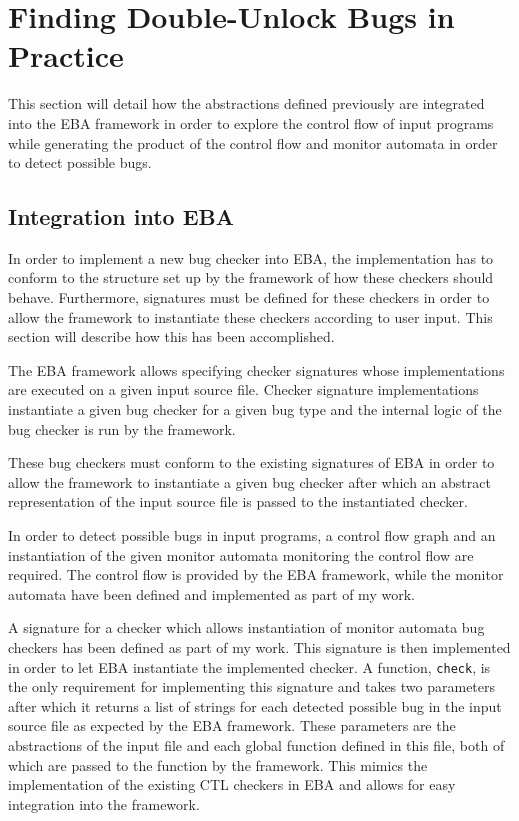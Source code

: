 \section{Finding Double-Unlock Bugs in Practice}
This section will detail how the abstractions defined previously are integrated into the EBA framework in order to explore the control flow of input programs while generating the product of the control flow and monitor automata in order to detect possible bugs. 

\subsection{Integration into EBA}
In order to implement a new bug checker into EBA, the implementation has to conform to the structure set up by the framework of how these checkers should behave. Furthermore, signatures must be defined for these checkers in order to allow the framework to instantiate these checkers according to user input. This section will describe how this has been accomplished.  

\newpar The EBA framework allows specifying checker signatures whose implementations are executed on a given input source file. Checker signature implementations instantiate a given bug checker for a given bug type and the internal logic of the bug checker is run by the framework. 

\newpar These bug checkers must conform to the existing signatures of EBA in order to allow the framework to instantiate a given bug checker after which an abstract representation of the input source file is passed to the instantiated checker. 

\newpar In order to detect possible bugs in input programs, a control flow graph and an instantiation of the given monitor automata monitoring the control flow are required. The control flow is provided by the EBA framework, while the monitor automata have been defined and implemented as part of my work. 

\newpar A signature for a checker which allows instantiation of monitor automata bug checkers has been defined as part of my work. This signature is then implemented in order to let EBA instantiate the implemented checker. A function, \texttt{check}, is the only requirement for implementing this signature and takes two parameters after which it returns a list of strings for each detected possible bug in the input source file as expected by the EBA framework. These parameters are the abstractions of the input file and each global function defined in this file, both of which are passed to the function by the framework. This mimics the implementation of the existing CTL checkers in EBA and allows for easy integration into the framework. 

